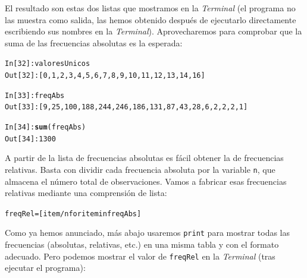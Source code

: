 \documentclass[10pt,a4paper]{article}\usepackage[]{graphicx}\usepackage[]{color}
\makeatletter
\newcommand{\hlkwd}[1]{\textcolor[rgb]{0.737,0.353,0.396}{\textbf{#1}}}%
\newenvironment{kframe}{%
 \def\at@end@of@kframe{}%
 \ifinner\ifhmode%
  \def\at@end@of@kframe{\end{minipage}}%
  \begin{minipage}{\columnwidth}%
 \fi\fi%
 \def\FrameCommand##1{\hskip\@totalleftmargin \hskip-\fboxsep
 \colorbox{shadecolor}{##1}\hskip-\fboxsep
     \hskip-\linewidth \hskip-\@totalleftmargin \hskip\columnwidth}%
 \MakeFramed {\advance\hsize-\width
   \@totalleftmargin\z@ \linewidth\hsize
   \@setminipage}}%
 {\par\unskip\endMakeFramed%
 \at@end@of@kframe}
\newenvironment{knitrout}{}{} %
\makeatother
\begin{document}
El resultado son estas dos listas que mostramos en la {\em Terminal} (el programa no las muestra como salida, las hemos obtenido después de ejecutarlo directamente escribiendo sus nombres en la {\em Terminal}). Aprovecharemos para comprobar que la suma de las frecuencias absolutas es la esperada:
\begin{knitrout}
\color{fgcolor}\begin{kframe}
\begin{alltt}
In [32]: valoresUnicos
Out[32]: [0, 1, 2, 3, 4, 5, 6, 7, 8, 9, 10, 11, 12, 13, 14, 16]

In [33]: freqAbs
Out[33]: [9, 25, 100, 188, 244, 246, 186, 131, 87, 43, 28, 6, 2, 2, 2, 1]

In [34]: \hlkwd{sum}(freqAbs)
Out[34]: 1300
\end{alltt}
\end{kframe}
\end{knitrout}
A partir de la lista de frecuencias absolutas es fácil obtener la de frecuencias relativas. Basta con dividir cada frecuencia absoluta por la variable {\tt n}, que almacena el número total de observaciones. Vamos a fabricar esas frecuencias relativas mediante una comprensión de lista:

\begin{knitrout}
\color{fgcolor}\begin{kframe}
\begin{alltt}
freqRel = [ item/n for item in freqAbs]
\end{alltt}
\end{kframe}
\end{knitrout}
Como ya hemos anunciado, más abajo usaremos {\tt print} para mostrar todas las frecuencias (absolutas, relativas, etc.) en una misma tabla y con el formato adecuado. Pero podemos mostrar el valor de {\tt freqRel} en la {\em Terminal} (tras ejecutar el programa):
\end{document}
